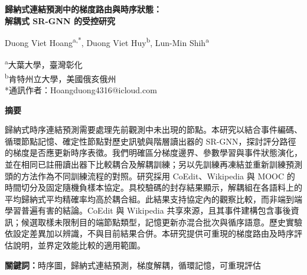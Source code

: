 \documentclass[a4paper,10pt]{article}
\begin{document}
\clearpage
\begin{center}
{\fontsize{18}{25}\selectfont\bfseries 歸納式連結預測中的梯度路由與時序狀態：\\解耦式 SR-GNN 的受控研究\par}
\vspace{12pt}
{\fontsize{10}{15}\selectfont Duong Viet Hoang\textsuperscript{a,*}, Duong Viet Huy\textsuperscript{b}, Lun-Min Shih\textsuperscript{a}\par}
\vspace{6pt}
\textsuperscript{a}大葉大學，臺灣彰化\\
\textsuperscript{b}肯特州立大學，美國俄亥俄州\\
*通訊作者：Hoangduong4316@icloud.com
\end{center}
\vspace{18pt}
\begin{center}\fontsize{11}{16.5}\selectfont\bfseries 摘要\end{center}
\begin{list}{}{\setlength{\leftmargin}{2cm}\setlength{\rightmargin}{2cm}}\item[]
歸納式時序連結預測需要處理先前觀測中未出現的節點。本研究以結合事件編碼、循環節點記憶、確定性節點對歷史訊號與階層讀出器的 SR-GNN，探討評分路徑的梯度是否應更新時序表徵。我們明確區分梯度邊界、參數學習與事件狀態演化，並在相同已註冊讀出器下比較耦合及解耦訓練；另以先訓練再凍結並重新訓練預測頭的方法作為不同訓練流程的對照。研究採用 CoEdit、Wikipedia 與 MOOC 的時間切分及固定隨機負樣本協定。具校驗碼的封存結果顯示，解耦組在各語料上的平均歸納式平均精確率均高於耦合組。此結果支持協定內的觀察比較，而非端到端學習普遍有害的結論。CoEdit 與 Wikipedia 共享來源，且其事件建構包含事後資訊；候選取樣未限制目的端節點類型，記憶更新亦混合批次與循序語意。歷史實驗依設定差異加以辨識，不與目前結果合併。本研究提供可重現的梯度路由及時序評估說明，並界定效能比較的適用範圍。

\vspace{10pt}\noindent\textbf{關鍵詞：}時序圖，歸納式連結預測，梯度解耦，循環記憶，可重現評估
\end{list}
\end{document}
